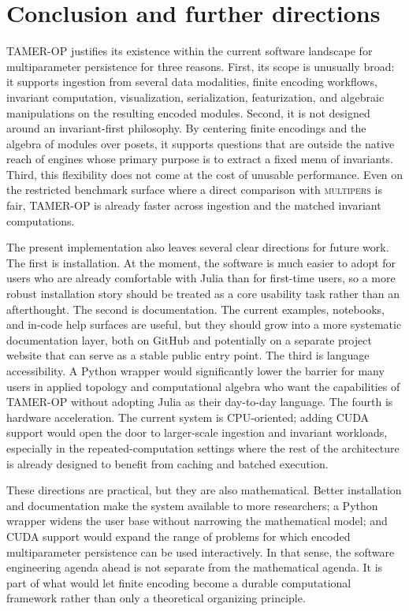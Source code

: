 \documentclass[11pt]{article}
\newcommand{\TAMER}{\textsc{TAMER-OP}}
\newcommand{\multipers}{\textsc{multipers}}
\theoremstyle{definition}
\theoremstyle{remark}
\begin{document}
\section{Conclusion and further directions}\label{sec:conclusion}

\TAMER{} justifies its existence within the current software landscape for multiparameter persistence for three reasons.  First, its scope is unusually broad: it supports ingestion from several data modalities, finite encoding workflows, invariant computation, visualization, serialization, featurization, and algebraic manipulations on the resulting encoded modules.  Second, it is not designed around an invariant-first philosophy.  By centering finite encodings and the algebra of modules over posets, it supports questions that are outside the native reach of engines whose primary purpose is to extract a fixed menu of invariants.  Third, this flexibility does not come at the cost of unusable performance.  Even on the restricted benchmark surface where a direct comparison with \multipers{} is fair, \TAMER{} is already faster across ingestion and the matched invariant computations.

The present implementation also leaves several clear directions for future work.  The first is installation.  At the moment, the software is much easier to adopt for users who are already comfortable with Julia than for first-time users, so a more robust installation story should be treated as a core usability task rather than an afterthought.  The second is documentation.  The current examples, notebooks, and in-code help surfaces are useful, but they should grow into a more systematic documentation layer, both on GitHub and potentially on a separate project website that can serve as a stable public entry point.  The third is language accessibility.  A Python wrapper would significantly lower the barrier for many users in applied topology and computational algebra who want the capabilities of \TAMER{} without adopting Julia as their day-to-day language.  The fourth is hardware acceleration.  The current system is CPU-oriented; adding CUDA support would open the door to larger-scale ingestion and invariant workloads, especially in the repeated-computation settings where the rest of the architecture is already designed to benefit from caching and batched execution.

These directions are practical, but they are also mathematical.  Better installation and documentation make the system available to more researchers; a Python wrapper widens the user base without narrowing the mathematical model; and CUDA support would expand the range of problems for which encoded multiparameter persistence can be used interactively.  In that sense, the software engineering agenda ahead is not separate from the mathematical agenda.  It is part of what would let finite encoding become a durable computational framework rather than only a theoretical organizing principle.
\end{document}
